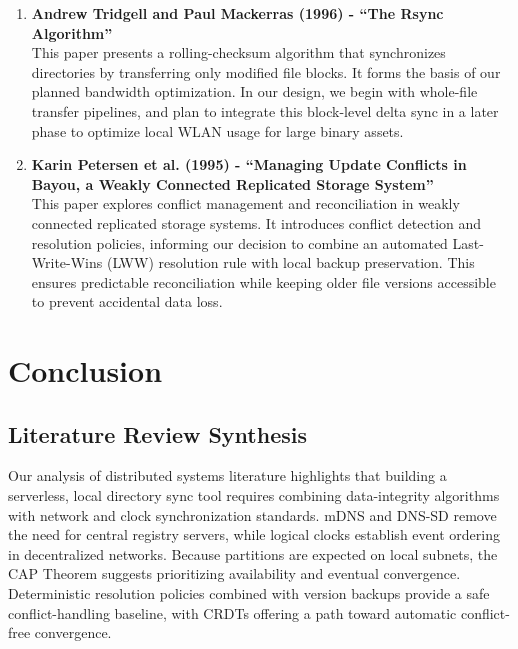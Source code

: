 \documentclass[11pt,oneside]{article}
\begin{document}
\begin{enumerate}
    \item \textbf{Andrew Tridgell and Paul Mackerras (1996) - ``The Rsync Algorithm''} \cite{rsync1996} \\
    This paper presents a rolling-checksum algorithm that synchronizes directories by transferring only modified file blocks. It forms the basis of our planned bandwidth optimization. In our design, we begin with whole-file transfer pipelines, and plan to integrate this block-level delta sync in a later phase to optimize local WLAN usage for large binary assets.

    \item \textbf{Karin Petersen et al. (1995) - ``Managing Update Conflicts in Bayou, a Weakly Connected Replicated Storage System''} \cite{bayou1995} \\
    This paper explores conflict management and reconciliation in weakly connected replicated storage systems. It introduces conflict detection and resolution policies, informing our decision to combine an automated Last-Write-Wins (LWW) resolution rule with local backup preservation. This ensures predictable reconciliation while keeping older file versions accessible to prevent accidental data loss.
\end{enumerate}

\section{Conclusion}

\subsection{Literature Review Synthesis}
Our analysis of distributed systems literature highlights that building a serverless, local directory sync tool requires combining data-integrity algorithms with network and clock synchronization standards. mDNS and DNS-SD \cite{rfc6762, rfc6763} remove the need for central registry servers, while logical clocks \cite{lamport1978} establish event ordering in decentralized networks. Because partitions are expected on local subnets, the CAP Theorem \cite{brewer2002} suggests prioritizing availability and eventual convergence. Deterministic resolution policies combined with version backups \cite{bayou1995} provide a safe conflict-handling baseline, with CRDTs \cite{shapiro2011} offering a path toward automatic conflict-free convergence.
\end{document}
